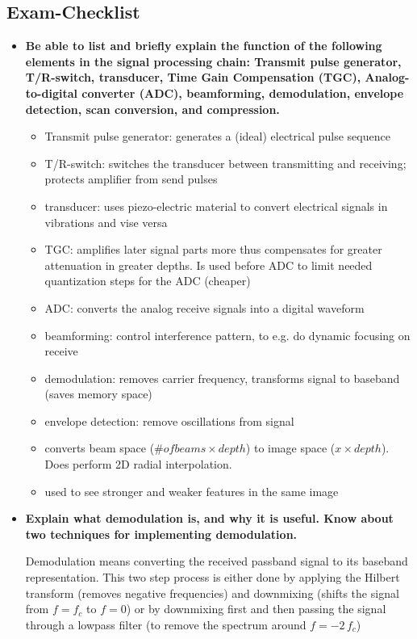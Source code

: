 \documentclass[10pt,a4paper,noendnumber=true]{scrartcl}
\begin{document}
\subsection{Exam-Checklist}
\begin{itemize}
\item \textbf{Be able to list and briefly explain the function of the following elements in the signal processing chain: Transmit pulse generator, T/R-switch, transducer, Time Gain Compensation (TGC), Analog-to-digital converter (ADC), beamforming, demodulation, envelope detection, scan conversion, and compression.}
\begin{itemize}
\item Transmit pulse generator: generates a (ideal) electrical pulse sequence
\item T/R-switch: switches the transducer between transmitting and receiving; protects amplifier from send pulses
\item transducer: uses piezo-electric material to convert electrical signals in vibrations and vise versa
\item TGC: amplifies later signal parts more thus compensates for greater attenuation in greater depths. Is used before ADC to limit needed quantization steps for the ADC (cheaper)
\item ADC: converts the analog receive signals into a digital waveform
\item beamforming: control interference pattern, to e.g. do dynamic focusing on receive
\item demodulation: removes carrier frequency, transforms signal to baseband (saves memory space)
\item envelope detection: remove oscillations from signal
\item converts beam space ($\# of beams \times depth$) to image space ($x \times depth$). Does perform 2D radial interpolation.
\item used to see stronger and weaker features in the same image
\end{itemize}

\item \textbf{Explain what demodulation is, and why it is useful. Know about two techniques for implementing demodulation.}

Demodulation means converting the received passband signal to its baseband representation. This two step process is either done by applying the Hilbert transform (removes negative frequencies) and downmixing (shifts the signal from $f=f_c$ to $f=0$) or by downmixing first and then passing the signal through a lowpass filter (to remove the spectrum around $f=-2\,f_c$)


\end{itemize}
\end{document}
